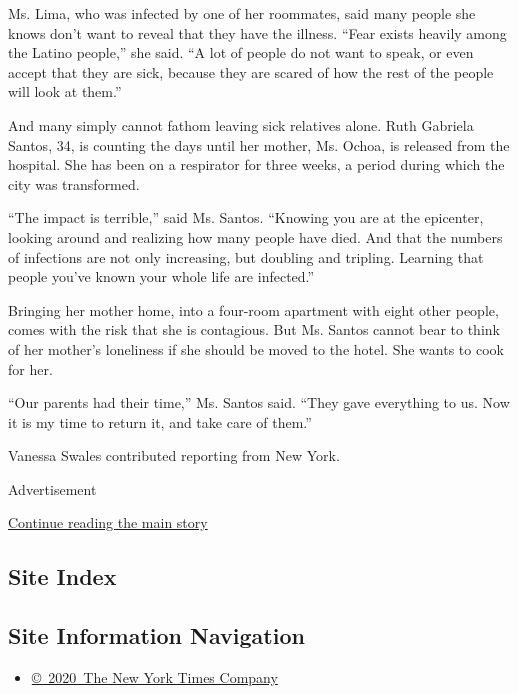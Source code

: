 Ms. Lima, who was infected by one of her roommates, said many people she
knows don't want to reveal that they have the illness. ``Fear exists
heavily among the Latino people,'' she said. ``A lot of people do not
want to speak, or even accept that they are sick, because they are
scared of how the rest of the people will look at them.''

And many simply cannot fathom leaving sick relatives alone. Ruth
Gabriela Santos, 34, is counting the days until her mother, Ms. Ochoa,
is released from the hospital. She has been on a respirator for three
weeks, a period during which the city was transformed.

``The impact is terrible,'' said Ms. Santos. ``Knowing you are at the
epicenter, looking around and realizing how many people have died. And
that the numbers of infections are not only increasing, but doubling and
tripling. Learning that people you've known your whole life are
infected.''

Bringing her mother home, into a four-room apartment with eight other
people, comes with the risk that she is contagious. But Ms. Santos
cannot bear to think of her mother's loneliness if she should be moved
to the hotel. She wants to cook for her.

``Our parents had their time,'' Ms. Santos said. ``They gave everything
to us. Now it is my time to return it, and take care of them.''

Vanessa Swales contributed reporting from New York.

Advertisement

\protect\hyperlink{after-bottom}{Continue reading the main story}

\hypertarget{site-index}{%
\subsection{Site Index}\label{site-index}}

\hypertarget{site-information-navigation}{%
\subsection{Site Information
Navigation}\label{site-information-navigation}}

\begin{itemize}
\tightlist
\item
  \href{https://help.nytimes.com/hc/en-us/articles/115014792127-Copyright-notice}{©~2020~The
  New York Times Company}
\end{itemize}

